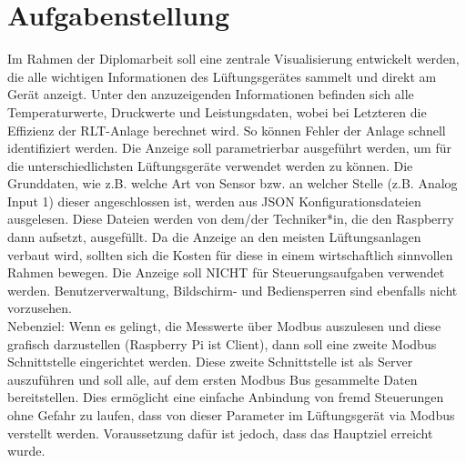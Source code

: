 \chapter{Aufgabenstellung} 
\label{aufgabenstellung}
Im Rahmen der Diplomarbeit soll eine zentrale Visualisierung entwickelt werden, die alle 
wichtigen Informationen des Lüftungsgerätes sammelt und direkt am Gerät anzeigt. Unter 
den anzuzeigenden Informationen befinden sich alle Temperaturwerte, Druckwerte und 
Leistungsdaten, wobei bei Letzteren die Effizienz der RLT-Anlage berechnet wird. So können 
Fehler der Anlage schnell identifiziert werden.
Die Anzeige soll parametrierbar ausgeführt werden, um für die unterschiedlichsten 
Lüftungsgeräte verwendet werden zu können. Die Grunddaten, wie z.B. welche Art von 
Sensor bzw. an welcher Stelle (z.B. Analog Input 1) dieser angeschlossen ist, werden aus JSON Konfigurationsdateien ausgelesen. Diese Dateien werden von dem/der Techniker*in, die den 
Raspberry dann aufsetzt, ausgefüllt.
Da die Anzeige an den meisten Lüftungsanlagen verbaut wird, sollten sich die Kosten für 
diese in einem wirtschaftlich sinnvollen Rahmen bewegen.
Die Anzeige soll NICHT für Steuerungsaufgaben verwendet werden. Benutzerverwaltung, 
Bildschirm- und Bediensperren sind ebenfalls nicht vorzusehen. \\

Nebenziel:
Wenn es gelingt, die Messwerte über Modbus auszulesen und diese grafisch darzustellen (Raspberry Pi ist 
Client), dann soll eine zweite Modbus Schnittstelle eingerichtet werden. Diese zweite 
Schnittstelle ist als Server auszuführen und soll alle, auf dem ersten Modbus Bus
gesammelte Daten bereitstellen. Dies ermöglicht eine einfache Anbindung von fremd 
Steuerungen ohne Gefahr zu laufen, dass von dieser Parameter im Lüftungsgerät via 
Modbus verstellt werden. Voraussetzung dafür ist jedoch, dass das Hauptziel erreicht wurde.